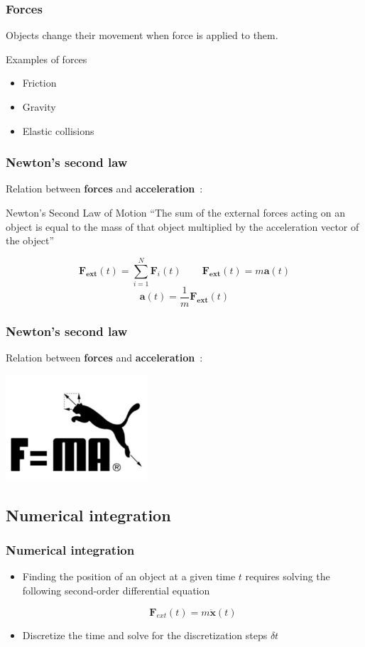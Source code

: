 \documentclass{beamer}
\begin{document}
\begin{frame}
  \frametitle{Forces}
  Objects change their movement when force is applied to them.
  \begin{exampleblock}{Examples of forces}
  \begin{itemize}
  \item Friction
  \item Gravity
  \item Elastic collisions
  \end{itemize}
  \end{exampleblock}
\end{frame}
  
\begin{frame}
 \frametitle{Newton's second law}
  Relation between \textbf{forces} and \textbf{acceleration}~:

    \begin{block}{Newton's Second Law of Motion}
      ``The sum of the external forces acting on an object
      is equal to the mass of that object multiplied by
      the acceleration vector of the object''

      $$
      \mathbf{F_{ext}}(t) = \sum_{i=1}^N \mathbf{F}_i(t) \hspace{25pt} 
      \mathbf{F_{ext}}(t) = m \mathbf{a}(t)
      $$
      \pause
      $$
      \mathbf{a}(t) = \frac{1}{m} \mathbf{{F}_{ext}}(t)
      $$
    \end{block}
\end{frame}

\begin{frame}
 \frametitle{Newton's second law}
  Relation between \textbf{forces} and \textbf{acceleration}~:
  \begin{center}\includegraphics{puma.png}\end{center}
\end{frame}

\subsection{Numerical integration}
\begin{frame}
  \frametitle{Numerical integration}

  \begin{itemize}
  \item Finding the position of an object at a given time $t$ requires solving
    the following second-order differential equation
    
    $$
    \mathbf{F}_{ext}(t) = m\ddot{\mathbf{x}}(t)
    $$
    \pause
  \item Discretize the time and solve for the discretization steps $\delta t$
  \end{itemize}
  
\end{frame}
\end{document}
